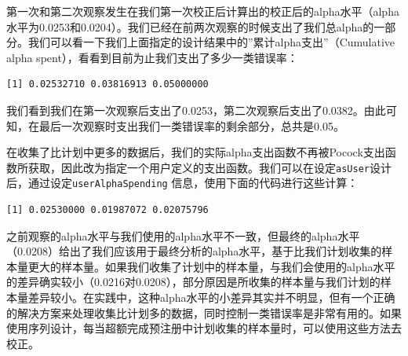 \documentclass[
  letterpaper,
  DIV=11,
  numbers=noendperiod]{scrreprt}
\newenvironment{Shaded}{\begin{snugshade}}{\end{snugshade}}
\newcommand{\AttributeTok}[1]{\textcolor[rgb]{0.40,0.45,0.13}{#1}}
\newcommand{\DecValTok}[1]{\textcolor[rgb]{0.68,0.00,0.00}{#1}}
\newcommand{\FloatTok}[1]{\textcolor[rgb]{0.68,0.00,0.00}{#1}}
\newcommand{\FunctionTok}[1]{\textcolor[rgb]{0.28,0.35,0.67}{#1}}
\newcommand{\NormalTok}[1]{\textcolor[rgb]{0.00,0.23,0.31}{#1}}
\newcommand{\OtherTok}[1]{\textcolor[rgb]{0.00,0.23,0.31}{#1}}
\newcommand{\SpecialCharTok}[1]{\textcolor[rgb]{0.37,0.37,0.37}{#1}}
\newcommand{\StringTok}[1]{\textcolor[rgb]{0.13,0.47,0.30}{#1}}
\begin{document}
第一次和第二次观察发生在我们第一次校正后计算出的校正后的alpha水平（alpha水平为0.0253和0.0204）。我们已经在前两次观察的时候支出了我们总alpha的一部分。我们可以看一下我们上面指定的设计结果中的''累计alpha支出''（Cumulative
alpha spent），看看到目前为止我们支出了多少一类错误率：

\begin{Shaded}
\end{Shaded}

\begin{verbatim}
[1] 0.02532710 0.03816913 0.05000000
\end{verbatim}

我们看到我们在第一次观察后支出了0.0253，第二次观察后支出了0.0382。由此可知，在最后一次观察时支出我们一类错误率的剩余部分，总共是0.05。

在收集了比计划中更多的数据后，我们的实际alpha支出函数不再被Pocock支出函数所获取，因此改为指定一个用户定义的支出函数。我们可以在设定\texttt{asUser}设计后，通过设定\texttt{userAlphaSpending}
信息，使用下面的代码进行这些计算：

\begin{Shaded}
\end{Shaded}

\begin{verbatim}
[1] 0.02530000 0.01987072 0.02075796
\end{verbatim}

之前观察的alpha水平与我们使用的alpha水平不一致，但最终的alpha水平（0.0208）给出了我们应该用于最终分析的alpha水平，基于比我们计划收集的样本量更大的样本量。如果我们收集了计划中的样本量，与我们会使用的alpha水平的差异确实较小（0.0216对0.0208），部分原因是所收集的样本量与我们计划的样本量差异较小。在实践中，这种alpha水平的小差异其实并不明显，但有一个正确的解决方案来处理收集比计划多的数据，同时控制一类错误率是非常有用的。如果使用序列设计，每当超额完成预注册中计划收集的样本量时，可以使用这些方法去校正。
\end{document}

